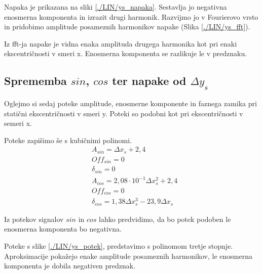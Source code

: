 Napaka je prikazana na sliki \ref{./LIN/ys_napaka}. Sestavlja jo negativna enosmerna komponenta in izrazit drugi harmonik.
Razvijmo jo v Fourierovo vrsto in pridobimo amplitude posameznih harmonikov napake (Slika \ref{./LIN/ys_fft}).

Iz fft-ja napake je vidna enaka amplituda drugega harmonika kot pri enaki ekscentričnosti v smeri x. Enosmerna komponenta se razlikuje le v predznaku.
\newpage
\subsection{Sprememba $sin$, $cos$ ter napake od $\Delta y_s$}

Oglejmo si sedaj poteke amplitude, enosmerne komponente in faznega zamika pri statični ekscentričnosti v smeri y. Poteki so podobni kot pri ekscentričnosti v semeri x.

Poteke zapišimo še s kubičnimi polinomi.
\begin{eqnarray}
 &A_{sin} = \Delta x_s+2,4\\
 &Off_{sin} = 0 \\
 &\delta_{sin} =0 \\
 &A_{cos} = 2,08 \cdot 10^{-1} \Delta x_s^2+2,4\\
 &Off_{cos} = 0 \\
 &\delta_{cos} = 1,38 \Delta x_s^3- 23,9 \Delta x_s
\end{eqnarray}

Iz potekov signalov $sin$ in $cos$ lahko predvidimo, da bo potek podoben le enosmerna komponenta bo negativna.


Poteke s slike \ref{./LIN/ys_potek}, predstavimo s polinomom tretje stopnje. Aproksimacije pokažejo enake amplitude posameznih harmonikov, le enosmerna komponenta je dobila negativen predznak.

